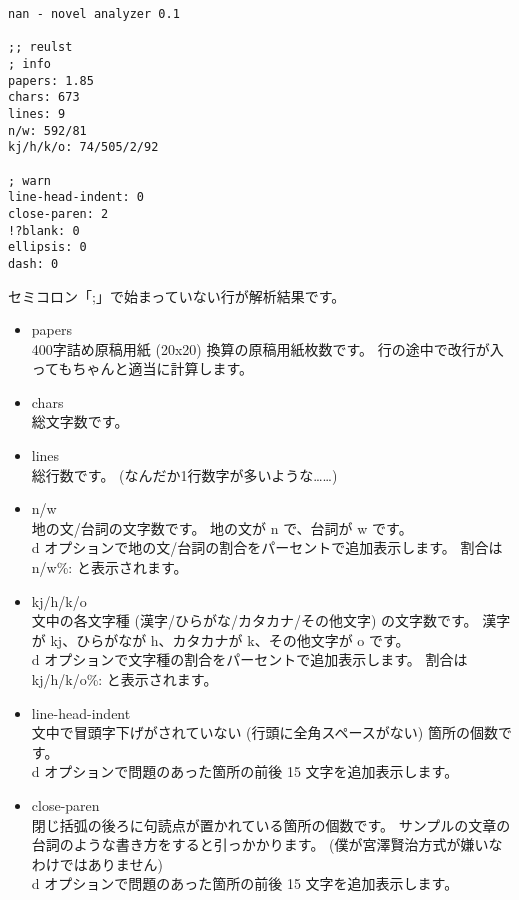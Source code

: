 \documentclass[a4j]{jsarticle}
\begin{document}
\begin{lstlisting}[caption=出力]
nan - novel analyzer 0.1

;; reulst
; info
papers: 1.85
chars: 673
lines: 9
n/w: 592/81
kj/h/k/o: 74/505/2/92

; warn
line-head-indent: 0
close-paren: 2
!?blank: 0
ellipsis: 0
dash: 0
\end{lstlisting}

セミコロン「;」で始まっていない行が解析結果です。

\begin{itemize}
  \item papers \\
    400字詰め原稿用紙 (20x20) 換算の原稿用紙枚数です。
    行の途中で改行が入ってもちゃんと適当に計算します。

  \item chars \\
    総文字数です。

  \item lines \\
    総行数です。
    (なんだか1行数字が多いような……)

  \item n/w \\
    地の文/台詞の文字数です。
    地の文が n で、台詞が w です。 \\
    d オプションで地の文/台詞の割合をパーセントで追加表示します。
    割合は n/w\%: と表示されます。
    
  \item kj/h/k/o \\
    文中の各文字種 (漢字/ひらがな/カタカナ/その他文字) の文字数です。
    漢字が kj、ひらがなが h、カタカナが k、その他文字が o です。 \\
    d オプションで文字種の割合をパーセントで追加表示します。
    割合は kj/h/k/o\%: と表示されます。

  \item line-head-indent \\
    文中で冒頭字下げがされていない (行頭に全角スペースがない) 箇所の個数です。 \\
    d オプションで問題のあった箇所の前後 15 文字を追加表示します。

  \item close-paren \\
    閉じ括弧の後ろに句読点が置かれている箇所の個数です。
    サンプルの文章の台詞のような書き方をすると引っかかります。
    (僕が宮澤賢治方式が嫌いなわけではありません) \\
    d オプションで問題のあった箇所の前後 15 文字を追加表示します。


\end{itemize}
\end{document}
